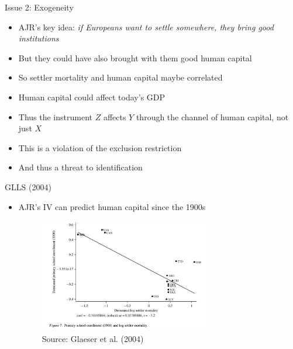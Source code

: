 \documentclass[11pt,notes=hide,aspectratio=169,mathserif]{beamer}
\begin{document}
\begin{frame}{Issue 2: Exogeneity}
\begin{itemize}
\item AJR's key idea: \textit<overlay specification>{if Europeans want to settle somewhere, they bring good institutions}
\item But they could have also brought with them good human capital
\item So settler mortality and human capital maybe correlated
\item Human capital could affect today's GDP
\item Thus the instrument $Z$ affects $Y$ through the channel of human capital, not just $X$
\item This is a violation of the exclusion restriction
\item And thus a threat to identification
\end{itemize}
\end{frame}

\begin{frame}{GLLS (2004)}
\begin{itemize}
\item AJR's IV can predict human capital since the 1900s
\begin{figure}
\centering
\includegraphics[width=0.7\textwidth]{inputs/GLLS1.png}
\caption{Source: Glaeser et al. (2004)}
\end{figure}
\end{itemize}
\end{frame}
\end{document}
